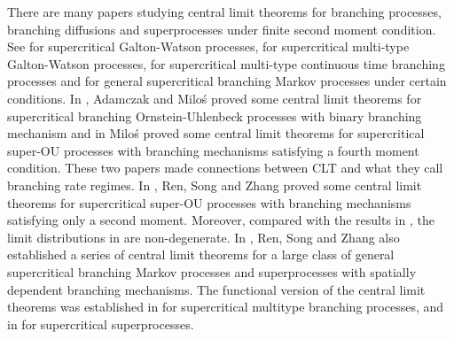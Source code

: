 \documentclass[12pt,a4paper]{amsart}
\theoremstyle{plain}
\theoremstyle{definition}
\numberwithin{equation}{section}
\begin{document}
    There are many papers studying central limit theorems for branching processes, branching diffusions and superprocesses under finite second moment condition.
    See
    \cite{Heyde1970A-rate, HeydeBrown1871An-invariance, HeydeLeslie1971Improved} for supercritical Galton-Watson processes, 
    \cite{KestenStigum1966Additional,KestenStigum1966A-limit} for supercritical multi-type Galton-Watson processes,
    \cite{Athreya1969Limit,Athreya1969LimitB,Athreya1971Some} for supercritical multi-type continuous time branching processes and \cite{AsmussenHering1983Branching} for general supercritical branching Markov processes under certain conditions.
    In \cite{AdamczakMilos2015CLT}, 
    Adamczak and Milo\'s 
    proved some central limit theorems for supercritical branching Ornstein-Uhlenbeck processes with binary branching mechanism and in \cite{Milos2012Spatial} Milo\'s proved some central limit theorems for supercritical super-OU processes with branching mechanisms satisfying a fourth moment condition.
    These two papers made connections between CLT and what they call branching rate regimes.
    In \cite{RenSongZhang2014Central}, Ren, Song and Zhang proved some central limit theorems for supercritical super-OU processes with branching mechanisms satisfying only a second moment.
    Moreover,
    compared with the results in \cite{AdamczakMilos2015CLT,Milos2012Spatial}, the limit distributions in \cite{RenSongZhang2014Central} are non-degenerate.
    In \cite{RenSongZhang2014CentralB,RenSongZhang2015Central,RenSongZhang2017Central},
    Ren, Song and Zhang also established a series of central limit theorems for a large class of general supercritical branching Markov processes and superprocesses with spatially dependent branching mechanisms.
    The functional version of the central limit theorems was established in \cite{Janson2004Functional} for supercritical multitype branching processes, and  in \cite{RenSongZhang2017Functional} for supercritical superprocesses.
\end{document}

